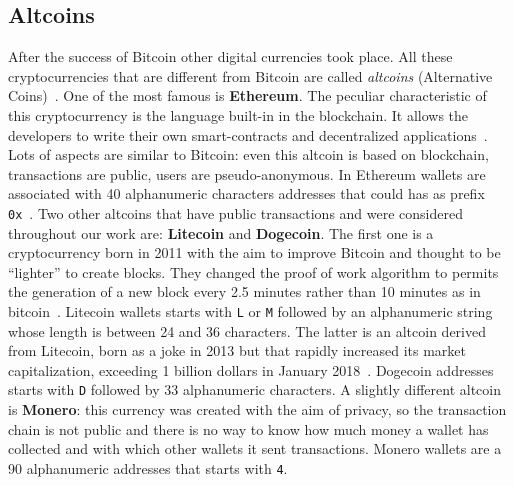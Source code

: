 \subsection{Altcoins}
After the success of Bitcoin other digital currencies took place.
All these cryptocurrencies that are different from Bitcoin are called
\emph{altcoins} (Alternative Coins)~\cite{bib:bitcoinbeyond}.
One of the most famous is
\textbf{Ethereum}. The peculiar characteristic of this cryptocurrency is
the language built-in in the blockchain. It allows the developers to
write their own smart-contracts and decentralized
applications~\cite{bib:ethereum:whitepaper}.
Lots of aspects are similar to Bitcoin: even
this altcoin is based on blockchain, transactions are public, users are
pseudo-anonymous. In Ethereum wallets are associated with 40
alphanumeric characters addresses that could has as prefix
\texttt{0x}~\cite{bib:ethereum:whitepaper}.
Two other altcoins that have public transactions and were considered
throughout our work are: \textbf{Litecoin} and \textbf{Dogecoin}.
The first one is a cryptocurrency born in 2011 with the aim to improve
Bitcoin and thought to be ``lighter'' to create blocks.
They changed the proof of work algorithm to permits the
generation of a new block every 2.5 minutes rather than 10 minutes as in
bitcoin~\cite{bib:litecoin:wiki}.
Litecoin wallets starts with \texttt{L} or \texttt{M} followed by an
alphanumeric string whose length is between 24 and 36 characters.
The latter is an altcoin derived from Litecoin, born as a joke in 2013
but that rapidly increased its market capitalization, exceeding 1
billion dollars in January 2018~\cite{}. Dogecoin addresses
starts with \texttt{D} followed by 33 alphanumeric characters.
A slightly different altcoin is \textbf{Monero}: this currency was
created with the aim of privacy, so the transaction chain is not public
and there is no way to know how much money a wallet has collected and
with which other wallets it sent transactions.
Monero wallets are a 90 alphanumeric addresses that starts with
\texttt{4}.


